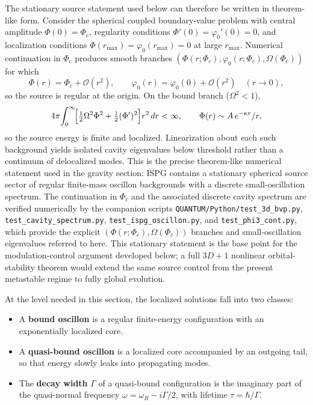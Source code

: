 \documentclass[aps,prd,onecolumn,superscriptaddress,nofootinbib,showpacs,12pt,notitlepage]{revtex4-2}
\renewcommand{\order}[1]{\mathcal{O}\!\left(#1\right)}
\begin{document}
The stationary source statement used below can therefore be
written in theorem-like form.  Consider the spherical coupled
boundary-value problem with central amplitude
$\Phi(0)=\Phi_c$, regularity conditions
$\Phi'(0)=\varphi_0'(0)=0$, and localization conditions
$\Phi(r_{\max})=\varphi_0(r_{\max})=0$ at large $r_{\max}$.
Numerical continuation in $\Phi_c$ produces smooth branches
$(\Phi(r;\Phi_c),\varphi_0(r;\Phi_c),\Omega(\Phi_c))$ for which
\begin{equation}
  \Phi(r) = \Phi_c + \order{r^2}, \qquad
  \varphi_0(r) = \varphi_0(0) + \order{r^2}
  \quad (r \to 0),
\end{equation}
so the source is regular at the origin.  On the bound branch
($\Omega^2 < 1$),
\begin{equation}
  4\pi\!\int_0^\infty\!\Bigl[
    \tfrac{1}{2}\Omega^2\Phi^2
    + \tfrac{1}{2}(\Phi')^2
  \Bigr]r^2\,dr < \infty,
  \qquad
  \Phi(r) \sim A\,e^{-\kappa r}/r,
\end{equation}
so the source energy is finite and localized.  Linearization
about each such background yields isolated cavity eigenvalues
below threshold rather than a continuum of delocalized modes.
This is the precise theorem-like numerical statement used in the
gravity section: ISPG contains a stationary spherical source
sector of regular finite-mass oscillon backgrounds with a
discrete small-oscillation spectrum.  The continuation in
$\Phi_c$ and the associated discrete cavity spectrum are
verified numerically by the companion scripts
\texttt{QUANTUM/Python/test\_3d\_bvp.py},
\texttt{test\_cavity\_spectrum.py},
\texttt{test\_ispg\_oscillon.py}, and
\texttt{test\_phi3\_cont.py}, which provide the explicit
$(\Phi(r;\Phi_c),\Omega(\Phi_c))$ branches and
small-oscillation eigenvalues referred to here.
This stationary statement is
the base point for the modulation-control argument developed below;
a full $3D+1$ nonlinear orbital-stability theorem would extend the
same source control from the present metastable regime to fully
global evolution.

At the level needed in this section, the localized solutions
fall into two classes:
\begin{itemize}
  \item A \textbf{bound oscillon} is a regular finite-energy
    configuration with an exponentially localized core.
  \item A \textbf{quasi-bound oscillon} is a localized core
    accompanied by an outgoing tail, so that energy slowly
    leaks into propagating modes.
  \item The \textbf{decay width} $\Gamma$ of a quasi-bound
    configuration is the imaginary part of the quasi-normal
    frequency $\omega = \omega_R - i\Gamma/2$, with lifetime
    $\tau = \hbar/\Gamma$.
\end{itemize}
\end{document}
